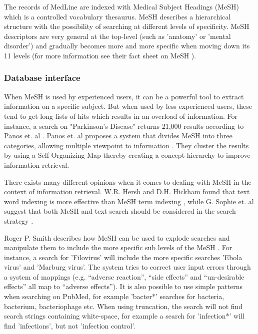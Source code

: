 The records of MedLine are indexed with Medical Subject Headings
(MeSH) which is a controlled vocabulary thesaurus. MeSH describes a
hierarchical structure with the possibility of searching at different
levels of specificity. MeSH descriptors are very general at the
top-level (such as 'anatomy' or 'mental disorder') and gradually
becomes more and more specific when moving down its 11 levels (for
more information see their fact sheet on MeSH \cite{FactSheetMeSH}).

\subsubsection{Database interface}
When MeSH is used by experienced users, it can be a powerful tool to
extract information on a specific subject. But when used by less
experienced users, these tend to get long lists of hits which results
in an overload of information. For instance, a search on "Parkinson's
Disease" returns 21,000 results according to Panos et. al
\cite{DataMiningBiomedicine}. Panos et. al proposes a system that
divides MeSH into three categories, allowing multiple viewpoint  to
information \cite{DataMiningBiomedicine}. They cluster the results by
using a Self-Organizing Map thereby creating a concept hierarchy to
improve information retrieval.

There exists many different opinions when it comes to dealing with
MeSH in the context of information retrieval. W.R. Hersh and
D.H. Hickham found that text word indexing is more effective than MeSH
term indexing \cite{RetrievalEffectiveness}, while G. Sophie et. al
suggest that both MeSH and text search should be considered in the
search strategy \cite{FDGPET}.

Roger P. Smith describes how MeSH can be used to explode searches and
manipulate them to include the more specific sub levels of the
MeSH \cite{TheInternetforPhysicians}. For instance, a search for 'Filovirus' will include the more
specific searches 'Ebola virus' and 'Marburg virus'. The system tries
to correct user input errors through a system of mappings
(e.g. ``adverse reaction'', ``side effects'' and ``un-desirable
effects'' all map to ``adverse effects''). It is also possible to use
simple patterns when searching on PubMed, for example 'bacter*'
searches for bacteria, bacterium, bacteriophage etc. When using
truncation, the search will not find search strings containing
white-space, for example a search for 'infection*' will find
'infections', but not 'infection control'.


